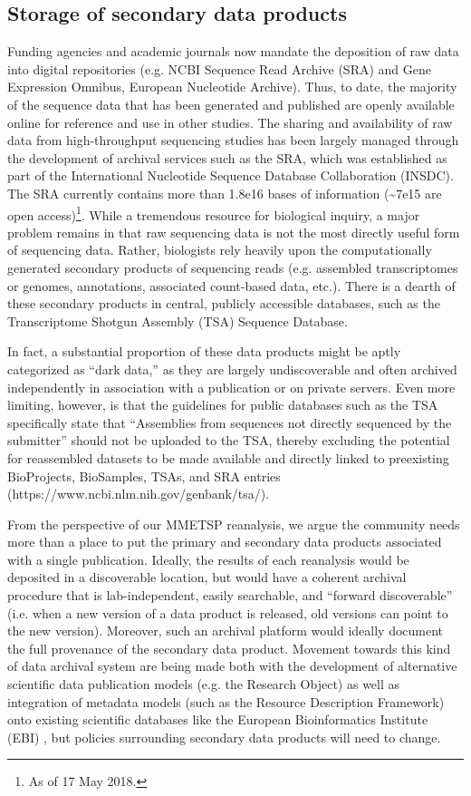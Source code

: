 \documentclass[a4paper,num-refs]{oup-contemporary}
\begin{document}
\subsection{Storage of secondary data products}
Funding agencies and academic journals now mandate the deposition of raw data into digital repositories (e.g. NCBI Sequence Read Archive (SRA) and Gene Expression Omnibus, European Nucleotide Archive). Thus, to date, the majority of the sequence data that has been generated and published are openly available online for reference and use in other studies. The sharing and availability of raw data from high-throughput sequencing studies has been largely managed through the development of archival services such as the SRA, which was established as part of the International Nucleotide Sequence Database Collaboration (INSDC)\cite{Kodama2012, Shumway2009}. The SRA currently contains more than 1.8e16 bases of information (\textasciitilde7e15 are open access)\footnote{As of 17 May 2018.}. While a tremendous resource for biological inquiry, a major problem remains in that raw sequencing data is not the most directly useful form of sequencing data. Rather, biologists rely heavily upon the computationally generated secondary products of sequencing reads (e.g. assembled transcriptomes or genomes, annotations, associated count-based data, etc.). There is a dearth of these secondary products in central, publicly accessible databases, such as the  Transcriptome Shotgun Assembly (TSA) Sequence Database.

In fact, a substantial proportion of these data products might be aptly categorized as ``dark data,'' as they are largely undiscoverable and often archived independently in association with a publication or on private servers. Even more limiting, however, is that the guidelines for public databases such as the TSA specifically state that ``Assemblies from sequences not directly sequenced by the submitter'' should not be uploaded to the TSA, thereby excluding the potential for reassembled datasets to be made available and directly linked to preexisting BioProjects, BioSamples, TSAs, and SRA entries (https://www.ncbi.nlm.nih.gov/genbank/tsa/).

From the perspective of our MMETSP reanalysis, we argue the community needs more than a place to put the primary and secondary data products associated with a single publication. Ideally, the results of each reanalysis would be deposited in a discoverable location, but would have a coherent archival procedure that is lab-independent, easily searchable, and ``forward discoverable'' (i.e. when a  new version of a data product is released, old versions can point to the new version). Moreover, such an archival platform would ideally document the full provenance of the secondary data product. Movement towards this kind of data archival system are being made both with the development of alternative scientific data publication models (e.g. the Research Object\cite{Bechhofer2013}) as well as integration of metadata models (such as the Resource Description Framework) onto existing scientific databases like the European Bioinformatics Institute (EBI) \cite{Callahan2013}, but policies surrounding secondary data products will need to change.
\end{document}
